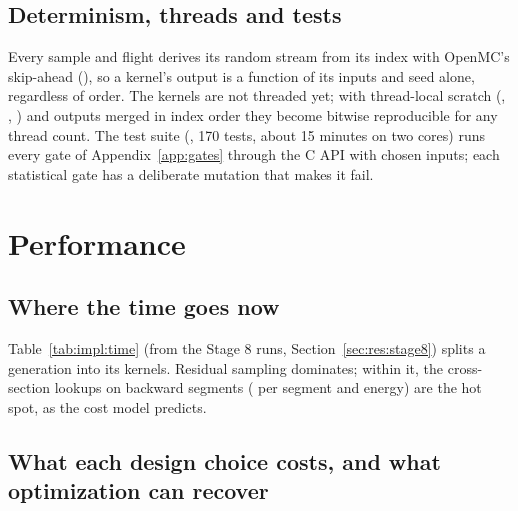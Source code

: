 \subsection{Determinism, threads and tests}

Every sample and flight derives its random stream from its index with OpenMC's skip-ahead
(), so a kernel's output is a function of its inputs and seed alone, regardless of
order. The kernels are not threaded yet; with thread-local scratch (, ,
) and outputs merged in index order they become bitwise reproducible for any thread count.
The test suite (, 170 tests, about 15 minutes on two cores) runs every gate of
Appendix~\ref{app:gates} through the C API with chosen inputs; each statistical gate has a deliberate
mutation that makes it fail.

\section{Performance}\label{sec:impl:performance}

\subsection{Where the time goes now}

Table~\ref{tab:impl:time} (from the Stage 8 runs, Section~\ref{sec:res:stage8}) splits a generation
into its kernels. Residual sampling dominates; within it, the cross-section lookups on backward
segments ( per segment and energy) are the hot spot, as the cost model predicts.

\subsection{What each design choice costs, and what optimization can recover}\label{sec:impl:projection}

